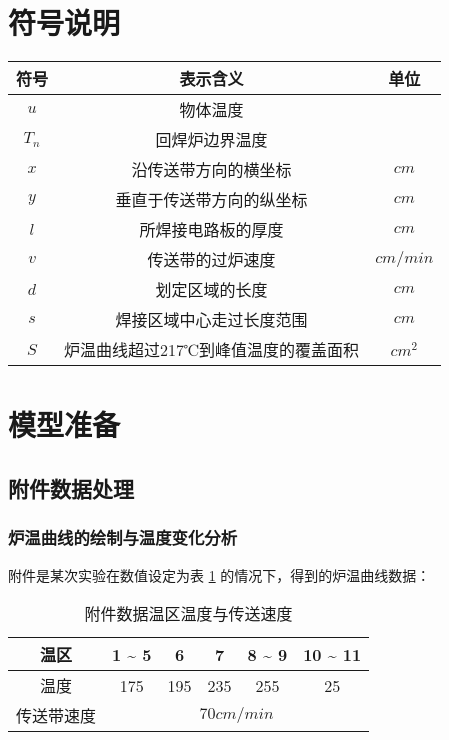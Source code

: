 \documentclass[withoutpreface,bwprint]{cumcmthesis} %
\numberwithin{equation}{subsection}
\begin{document}
\section{符号说明}


\begin{table}[h]
	\centering
	\begin{tabular}{ccc}
		\toprule[1.5pt]
		符号   &    表示含义 &   单位  \\
		\midrule[1pt]
		$u$ & 物体温度 & \textcelsius  \\
		$T_{n}$ & 回焊炉边界温度 & \textcelsius \\
		$x$& 沿传送带方向的横坐标 &  $cm$ \\
		$y$& 垂直于传送带方向的纵坐标 &  $cm$   \\
		$l$& 所焊接电路板的厚度 &   $cm$  \\
		$v$& 传送带的过炉速度 &   $cm/min$  \\
		$d$& 划定区域的长度 &    $cm$ \\
		$s$& 焊接区域中心走过长度范围 &   $cm$  \\
		$S$& 炉温曲线超过217℃到峰值温度的覆盖面积 &   $cm^2$  \\
		\bottomrule[1.5pt]
		
	\end{tabular}
\end{table}

\section{模型准备}
\subsection{附件数据处理}
\subsubsection{炉温曲线的绘制与温度变化分析}
 附件是某次实验在数值设定为表 \ref{speed_1}   的情况下，得到的炉温曲线数据：
\begin{table}[!htbp]
 	\caption[speed1]{附件数据温区温度与传送速度}
 	\label{speed_1}
 	\centering
 	\begin{tabular}{cccccc}
 		\toprule[2.0pt]
		温区 & 1 \~{} 5 & 6 & 7 & 8 \~{} 9 & 10 \~{} 11\\
 		\midrule[1pt]
 		温度 & 175\textcelsius & 195\textcelsius & 235\textcelsius & 255\textcelsius &  25\textcelsius \\
 		\midrule[1pt]
 		传送带速度 &\multicolumn{5}{c}{$70cm/min$}\\
 		\bottomrule[2.0pt]
 	\end{tabular}
\end{table}
\end{document}
